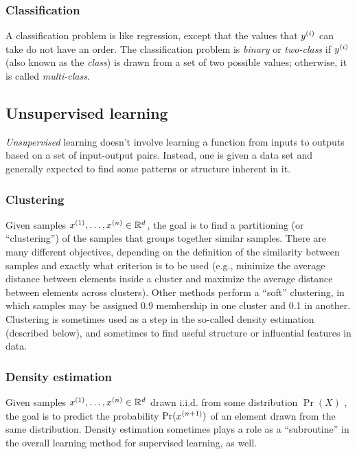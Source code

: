 \subsubsection{Classification}

A classification problem is like regression, except that
the values that $y^{(i)}$ can take do not have an order.
The classification problem is
  {\em binary} or {\em two-class} if $y^{(i)}$ (also known as the {\em class})
is drawn from a set of two possible values; otherwise, it is called
  {\em multi-class}.

\subsection{Unsupervised learning}
\label{sec-intro_unsupervised}

{\em Unsupervised} learning doesn't
involve learning a function from inputs to outputs based on a set of
input-output pairs.  Instead, one is given a data set and generally
expected to find some patterns or structure inherent in it.

\subsubsection{Clustering}

Given samples $x^{(1)}, \ldots, x^{(n)} \in \mathbb{R}^d$, the goal is to
find a partitioning (or ``clustering'') of the samples that groups together similar samples.  There are many different objectives, depending on the
definition of the similarity between samples and exactly what
criterion is to be used (e.g., minimize the average distance between
elements inside a cluster and maximize the average distance between
elements across clusters).  Other methods perform a ``soft''
clustering, in which samples may be assigned 0.9 membership in one
cluster and 0.1 in another.  Clustering is sometimes used as a step in
the so-called density estimation (described below), and sometimes to find useful structure or influential
features in data.


\subsubsection{Density estimation}

Given samples $x^{(1)}, \ldots, x^{(n)} \in \mathbb{R}^d$ drawn i.i.d.
from some distribution $\Pr(X)$ , the goal is to predict the probability
$\Pr(x^{(n+1)})$ of an element drawn from the same distribution.
Density estimation sometimes plays a role as a ``subroutine'' in the
overall learning method for supervised learning, as well.

